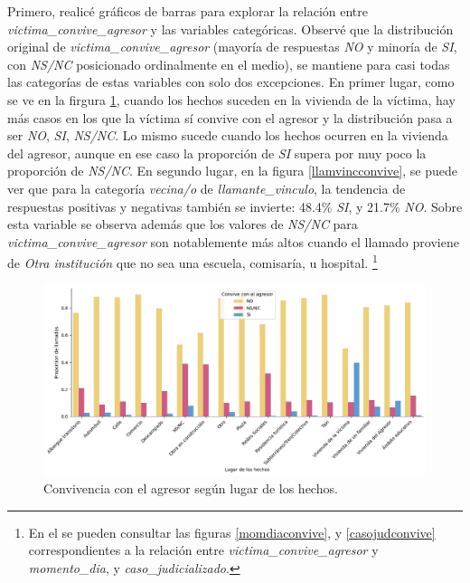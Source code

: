 \documentclass[10 pt]{article}
\begin{document}
Primero, realicé gráficos de barras para explorar la relación entre \textit{victima\_convive\_agresor} y las variables categóricas.
Observé que la distribución original de \textit{victima\_convive\_agresor} (mayoría de respuestas \textit{NO} y minoría de \textit{SI}, con \textit{NS/NC} posicionado ordinalmente en el medio), se mantiene para casi todas las categorías de estas variables con solo dos excepciones. En primer lugar, como se ve en la firgura \ref{hecholugconvive}, cuando los hechos suceden en la vivienda de la víctima, hay más casos en los que la víctima sí convive con el agresor y la distribución pasa a ser \textit{NO}, \textit{SI}, \textit{NS/NC}. Lo mismo sucede cuando los hechos ocurren en la vivienda del agresor, aunque en ese caso la proporción de \textit{SI} supera por muy poco la proporción de \textit{NS/NC}. En segundo lugar, en la figura \ref{llamvincconvive}, se puede ver que para la categoría \textit{vecina/o} de \textit{llamante\_vinculo}, la tendencia de respuestas positivas y negativas también se invierte: 48.4\% \textit{SI}, y 21.7\% \textit{NO}. Sobre esta variable se observa además que los valores de \textit{NS/NC} para \textit{victima\_convive\_agresor} son notablemente más altos cuando el llamado proviene de \textit{Otra institución} que no sea una escuela, comisaría, u hospital. \footnote{En el   se pueden consultar las figuras \ref{momdiaconvive}, y \ref{casojudconvive} correspondientes a la relación entre \textit{victima\_convive\_agresor} y \textit{momento\_dia}, y \textit{caso\_judicializado}.}


\begin{figure}[H]
    \begin{center}
    \includegraphics[scale=.5]{images/latex_hecho_lugar_convive.png}
    \caption{Convivencia con el agresor según lugar de los hechos.}
    \label{hecholugconvive}
    \end{center}
    \end{figure}
    
\end{document}
